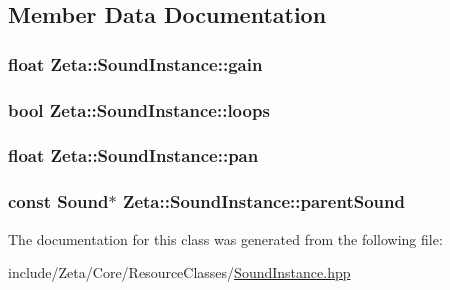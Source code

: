 \subsection{Member Data Documentation}
\hypertarget{classZeta_1_1SoundInstance_acb82c5783574e56f82116574bea15e6d}{
\subsubsection[{gain}]{\setlength{\rightskip}{0pt plus 5cm}float Zeta\+::\+Sound\+Instance\+::gain\hspace{0.3cm}{\ttfamily [protected]}}}\label{classZeta_1_1SoundInstance_acb82c5783574e56f82116574bea15e6d}
\hypertarget{classZeta_1_1SoundInstance_a22ccff32fba2ad1ea881a186c86f93c0}{
\subsubsection[{loops}]{\setlength{\rightskip}{0pt plus 5cm}bool Zeta\+::\+Sound\+Instance\+::loops\hspace{0.3cm}{\ttfamily [protected]}}}\label{classZeta_1_1SoundInstance_a22ccff32fba2ad1ea881a186c86f93c0}
\hypertarget{classZeta_1_1SoundInstance_a7635755856cabd34dd383bf8edddfdbb}{
\subsubsection[{pan}]{\setlength{\rightskip}{0pt plus 5cm}float Zeta\+::\+Sound\+Instance\+::pan\hspace{0.3cm}{\ttfamily [protected]}}}\label{classZeta_1_1SoundInstance_a7635755856cabd34dd383bf8edddfdbb}
\hypertarget{classZeta_1_1SoundInstance_a1a11c5a5c711141061cda151207eb730}{
\subsubsection[{parent\+Sound}]{\setlength{\rightskip}{0pt plus 5cm}const {\bf Sound}$\ast$ Zeta\+::\+Sound\+Instance\+::parent\+Sound\hspace{0.3cm}{\ttfamily [protected]}}}\label{classZeta_1_1SoundInstance_a1a11c5a5c711141061cda151207eb730}


The documentation for this class was generated from the following file\+:\begin{DoxyCompactItemize}
\item 
include/\+Zeta/\+Core/\+Resource\+Classes/\hyperlink{SoundInstance_8hpp}{Sound\+Instance.\+hpp}\end{DoxyCompactItemize}

